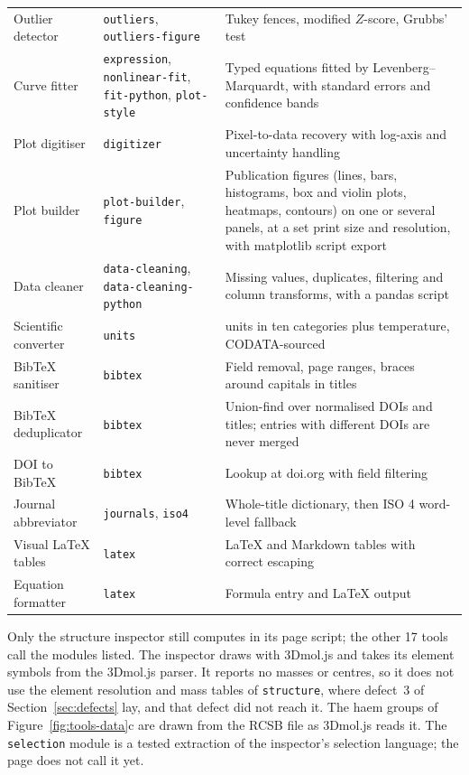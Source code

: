 \documentclass[11pt,a4paper]{article}
\begin{document}
\begin{table}[htbp]
\begin{tabular}{@{}>{\raggedright\arraybackslash}p{2.8cm}>{\raggedright\arraybackslash}p{4.1cm}>{\raggedright\arraybackslash}p{5.9cm}@{}}
Outlier detector & \texttt{outliers}, \texttt{outliers-figure} & Tukey fences, modified $Z$-score, Grubbs' test \\
Curve fitter & \texttt{expression}, \texttt{nonlinear-fit}, \texttt{fit-python}, \texttt{plot-style} & Typed equations fitted by Levenberg--Marquardt, with standard errors and confidence bands \\
Plot digitiser & \texttt{digitizer} & Pixel-to-data recovery with log-axis and uncertainty handling \\
Plot builder & \texttt{plot-builder}, \texttt{figure} & Publication figures (lines, bars, histograms, box and violin plots, heatmaps, contours) on one or several panels, at a set print size and resolution, with matplotlib script export \\
Data cleaner & \texttt{data-cleaning}, \texttt{data-cleaning-python} & Missing values, duplicates, filtering and column transforms, with a pandas script \\
Scientific converter & \texttt{units} & 64 units in ten categories plus temperature, CODATA-sourced \\
BibTeX sanitiser & \texttt{bibtex} & Field removal, page ranges, braces around capitals in titles \\
BibTeX deduplicator & \texttt{bibtex} & Union-find over normalised DOIs and titles; entries with different DOIs are never merged \\
DOI to BibTeX & \texttt{bibtex} & Lookup at doi.org with field filtering \\
Journal abbreviator & \texttt{journals}, \texttt{iso4} & Whole-title dictionary, then ISO 4 word-level fallback \\
Visual LaTeX tables & \texttt{latex} & LaTeX and Markdown tables with correct escaping \\
Equation formatter & \texttt{latex} & Formula entry and LaTeX output \\
\bottomrule
\end{tabular}
\end{table}

Only the structure inspector still computes in its page script; the other 17
tools call the modules listed. The inspector draws with 3Dmol.js and takes its
element symbols from the 3Dmol.js parser. It reports no masses or centres, so it
does not use the element resolution and mass tables of \texttt{structure}, where
defect~3 of Section~\ref{sec:defects} lay, and that defect did not reach it. The
haem groups of Figure~\ref{fig:tools-data}c are drawn from the RCSB file as
3Dmol.js reads it. The \texttt{selection} module is a tested extraction of the
inspector's selection language; the page does not call it yet.
\end{document}

